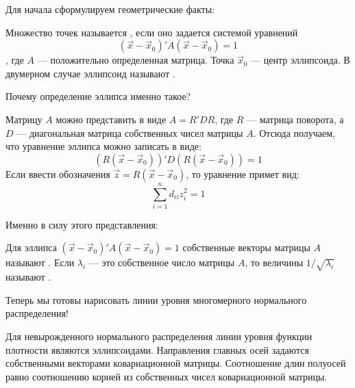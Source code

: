 Для начала сформулируем геометрические факты:
\begin{mydef}
Множество точек называется , если оно задается системой уравнений
\begin{equation}
(\vec{x}-\vec{x}_{0})' A (\vec{x}-\vec{x}_{0})=1
\end{equation}
, где $A$ --- положительно определенная матрица. Точка $\vec{x}_{0}$ --- центр эллипсоида. В двумерном случае эллипсоид называют .
\end{mydef}


Почему определение эллипса именно такое?

Матрицу $A$ можно представить в виде $A=R'DR$, где $R$ --- матрица поворота, а $D$ --- диагональная матрица собственных чисел матрицы $A$. Отсюда получаем, что уравнение эллипса можно записать в виде:
\begin{equation}
(R(\vec{x}-\vec{x}_{0}))' D (R(\vec{x}-\vec{x}_{0}))=1
\end{equation}
Если ввести обозначения $\vec{z}=R(\vec{x}-\vec{x}_{0})$, то уравнение примет вид:
\begin{equation}
\sum_{i=1}^{n} d_{ii}z_{i}^{2}=1
\end{equation}

Именно в силу этого представления:
\begin{mydef}
Для эллипса $(\vec{x}-\vec{x}_{0})' A (\vec{x}-\vec{x}_{0})=1$ собственные векторы матрицы $A$ называют . Если $\lambda_{i}$ --- это собственное число матрицы $A$, то величины $1/\sqrt{\lambda_{i}}$ называют .
\end{mydef}


Теперь мы готовы нарисовать линии уровня многомерного нормального распределения!
\begin{myth}
Для невырожденного нормального распределения линии уровня функции плотности являются эллипсоидами. Направления главных осей задаются собственными векторами ковариационной матрицы. Соотношение длин полуосей равно соотношению корней из собственных чисел ковариационной матрицы.
\end{myth}


